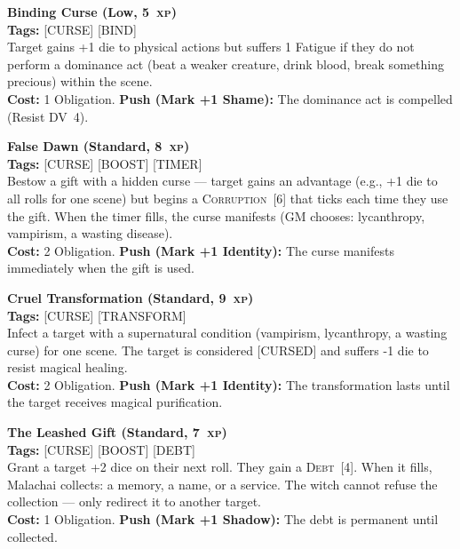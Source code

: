 \documentclass[10pt,twoside]{book}
\newcommand{\dv}[1]{\textsc{DV}~#1}
\newcommand{\xp}[1]{#1~\textsc{xp}}
\newcommand{\timer}[2]{\textsc{#1}~[#2]}
\begin{document}
\begin{ritestat}
\textbf{Binding Curse (Low, \xp{5})} \\
\textbf{Tags:} [CURSE] [BIND] \\
Target gains +1 die to physical actions but suffers 1 Fatigue if they do not perform a dominance act (beat a weaker creature, drink blood, break something precious) within the scene. \\
\textbf{Cost:} 1 Obligation. \textbf{Push (Mark +1 Shame):} The dominance act is compelled (Resist \dv{4}).
\end{ritestat}

\begin{ritestat}
\textbf{False Dawn (Standard, \xp{8})} \\
\textbf{Tags:} [CURSE] [BOOST] [TIMER] \\
Bestow a gift with a hidden curse --- target gains an advantage (e.g., +1 die to all rolls for one scene) but begins a \timer{Corruption}{6} that ticks each time they use the gift. When the timer fills, the curse manifests (GM chooses: lycanthropy, vampirism, a wasting disease). \\
\textbf{Cost:} 2 Obligation. \textbf{Push (Mark +1 Identity):} The curse manifests immediately when the gift is used.
\end{ritestat}

\begin{ritestat}
\textbf{Cruel Transformation (Standard, \xp{9})} \\
\textbf{Tags:} [CURSE] [TRANSFORM] \\
Infect a target with a supernatural condition (vampirism, lycanthropy, a wasting curse) for one scene. The target is considered [CURSED] and suffers -1 die to resist magical healing. \\
\textbf{Cost:} 2 Obligation. \textbf{Push (Mark +1 Identity):} The transformation lasts until the target receives magical purification.
\end{ritestat}

\begin{ritestat}
\textbf{The Leashed Gift (Standard, \xp{7})} \\
\textbf{Tags:} [CURSE] [BOOST] [DEBT] \\
Grant a target +2 dice on their next roll. They gain a \timer{Debt}{4}. When it fills, Malachai collects: a memory, a name, or a service. The witch cannot refuse the collection --- only redirect it to another target. \\
\textbf{Cost:} 1 Obligation. \textbf{Push (Mark +1 Shadow):} The debt is permanent until collected.
\end{ritestat}
\end{document}
